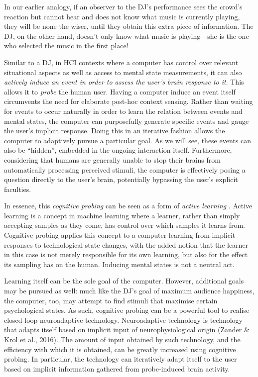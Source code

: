 In our earlier analogy, if an observer to the DJ's performance sees the crowd's reaction but cannot hear and does not know what music is currently playing, they will be none the wiser, until they obtain this extra piece of information. The DJ, on the other hand, doesn't only know what music is playing---she is the one who selected the music in the first place!

Similar to a DJ, in HCI contexts where a computer has control over relevant situational aspects as well as access to mental state measurements, it can also \emph{actively induce an event in order to assess the user's brain response to it}. This allows it to \emph{probe} the human user. Having a computer induce an event itself circumvents the need for elaborate post-hoc context sensing. Rather than waiting for events to occur naturally in order to learn the relation between events and mental states, the computer can purposefully generate specific events and gauge the user's implicit response. Doing this in an iterative fashion allows the computer to adaptively pursue a particular goal. As we will see, these events can also be ``hidden'', embedded in the ongoing interaction itself. Furthermore, considering that humans are generally unable to stop their brains from automatically processing perceived stimuli, the computer is effectively posing a question directly to the user's brain, potentially bypassing the user's explicit faculties.

In essence, this \emph{cognitive probing} can be seen as a form of \emph{active learning} \cite{settles2009activelearning}. Active learning is a concept in machine learning where a learner, rather than simply accepting samples as they come, has control over which samples it learns from. Cognitive probing applies this concept to a computer learning from implicit responses to technological state changes, with the added notion that the learner in this case is not merely responsible for its own learning, but also for the effect its sampling has on the human. Inducing mental states is not a neutral act.

Learning itself can be the sole goal of the computer. However, additional goals may be pursued as well: much like the DJ's goal of maximum audience happiness, the computer, too, may attempt to find stimuli that maximise certain psychological states. As such, cognitive probing can be a powerful tool to realise closed-loop neuroadaptive technology. Neuroadaptive technology is technology that adapts itself based on implicit input of neurophysiological origin (Zander \& Krol et al., 2016). The amount of input obtained by such technology, and the efficiency with which it is obtained, can be greatly increased using cognitive probing. In particular, the technology can iteratively adapt itself to the user based on implicit information gathered from probe-induced brain activity. 

